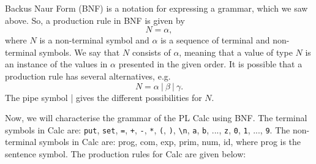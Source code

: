 \documentclass[a4paper, openany]{memoir}
\begin{document}
Backus Naur Form (BNF) is a notation for expressing a grammar, which we saw above. So, a production rule in BNF is given by
\[N = \alpha,\]
where $N$ is a non-terminal symbol and $\alpha$ is a sequence of terminal and non-terminal symbols. We say that $N$ consists of $\alpha$, meaning that a value of type $N$ is an instance of the values in $\alpha$ presented in the given order. It is possible that a production rule has several alternatives, e.g. 
\[N = \alpha \ | \ \beta \ | \ \gamma.\]
The pipe symbol | gives the different possibilities for $N$.

Now, we will characterise the grammar of the PL Calc using BNF. The terminal symbols in Calc are: \texttt{put}, \texttt{set}, \texttt{=}, \texttt{+}, \texttt{-}, \texttt{*}, \texttt{(}, \texttt{)}, \texttt{\textbackslash n}, \texttt{a}, \texttt{b}, ..., \texttt{z}, \texttt{0}, \texttt{1}, ..., \texttt{9}. The non-terminal symbols in Calc are: prog, com, exp, prim, num, id, where prog is the sentence symbol. The production rules for Calc are given below:
\end{document}
